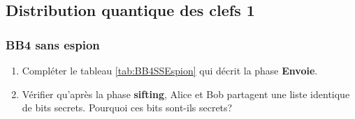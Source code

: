 \subsection{Distribution quantique des clefs 1}

\subsubsection{BB4 sans espion}

\begin{enumerate}
\item Compléter le tableau \ref{tab:BB4SSEspion} qui décrit la phase
\textbf{Envoie}.

\item Vérifier qu'après la phase \textbf{sifting}, Alice et Bob partagent une
liste identique de bits secrets. Pourquoi ces bits sont-ils secrets?
\end{enumerate}

